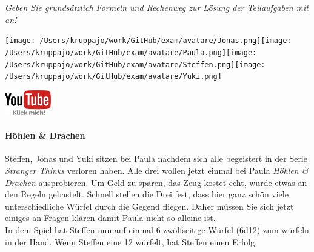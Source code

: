 \documentclass[a4paper, 9pt]{scrartcl}\usepackage[]{graphicx}\usepackage[]{xcolor}
\begin{document}
\textit{Geben Sie grundsätzlich Formeln und Rechenweg zur Lösung der Teilaufgaben mit an!} \\[1Ex]
 

 
\ifcollection
\begin{flushright}
\tiny\vspace{-3Ex}
\textbf{\examinhaltstart}
\exammodulemathstat
\vspace{-4Ex}
\end{flushright}
\begin{minipage}[t]{0.5\textwidth}
\texttt{[image: /Users/kruppajo/work/GitHub/exam/avatare/Jonas.png]}\hspace{-4mm}\texttt{[image: /Users/kruppajo/work/GitHub/exam/avatare/Paula.png]}\hspace{-4mm}\texttt{[image: /Users/kruppajo/work/GitHub/exam/avatare/Steffen.png]}\hspace{-4mm}\texttt{[image: /Users/kruppajo/work/GitHub/exam/avatare/Yuki.png]}
\end{minipage}
\begin{minipage}[t]{0.5\textwidth}
\hfill
\href{https://youtu.be/8Pb2sKUIMyk}{\includegraphics[width = 2cm]{img/youtube}}
\end{minipage}
\fi




\ifcollection
\paragraph{Höhlen \& Drachen}
\fi



Steffen, Jonas und Yuki sitzen bei Paula nachdem sich alle begeistert in der Serie \textit{Stranger Thinks} verloren haben. Alle drei wollen jetzt einmal bei Paula \textit{Höhlen \& Drachen} ausprobieren. Um Geld zu sparen, das Zeug kostet echt, wurde etwas an den Regeln gebastelt. Schnell stellen die Drei fest, dass hier ganz schön viele unterschiedliche Würfel durch die Gegend fliegen. Daher müssen Sie sich jetzt einiges an Fragen klären damit Paula nicht so alleine ist. \\%

In dem Spiel hat Steffen nun auf einmal 6 zwölfseitige Würfel (6d12) zum würfeln in der Hand. Wenn Steffen eine 12 würfelt, hat Steffen einen Erfolg.
\end{document}
